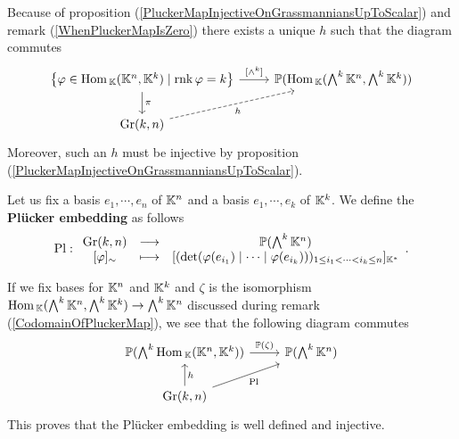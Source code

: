 \begin{remark}
Because of proposition (\ref{PluckerMapInjectiveOnGrassmanniansUpToScalar}) and remark (\ref{WhenPluckerMapIsZero}) there exists a unique $h$ such that the diagram commutes
\[\begin{tikzcd}
	{\cpa{\vp\in \Hom_\K(\K^n,\K^k)\mid \rnk \vp=k}} & {\Pj(\Hom_\K(\bigwedge^k\K^n,\bigwedge^k\K^k))} \\
	{\Gr(k,n)}
	\arrow["\pi", from=1-1, to=2-1]
	\arrow["{[\wedge^k]}", from=1-1, to=1-2]
	\arrow["h"', dashed, from=2-1, to=1-2]
\end{tikzcd}\]
Moreover, such an $h$ must be injective by proposition (\ref{PluckerMapInjectiveOnGrassmanniansUpToScalar}).
\end{remark}


\begin{definition}
Let us fix a basis $e_1,\cdots, e_n$ of $\mathbb{K}^n$ and a basis $e_1,\cdots, e_k$ of $\mathbb{K}^k$. We define the \textbf{Pl\"ucker embedding} as follows
\[\mathrm{Pl}:\begin{array}{ccc} {\mathrm{Gr}(k,n)} & \longrightarrow & {\mathbb{P}(\bigwedge^k\mathbb{K}^n)}\\ {[\varphi]_\sim} & \longmapsto & {[(\det(\varphi(e_{i_1})\mid\cdots\mid\varphi(e_{i_k})))_{1\leq i_1<\cdots<i_k\leq n}]_{\mathbb{K}^\ast}} \end{array}.\]
\end{definition}

\begin{remark}
If we fix bases for $\mathbb{K}^n$ and $\mathbb{K}^k$ and $\zeta$ is the isomorphism $\mathrm{Hom}\,_{\mathbb{K}}(\bigwedge^k\mathbb{K}^n,\bigwedge^k\mathbb{K}^k)\to \bigwedge^k\mathbb{K}^n$ discussed during remark (\ref{CodomainOfPluckerMap}), we see that the following diagram commutes
\[\begin{tikzcd}
	{\Pj(\bigwedge^k\Hom_\K(\K^n,\K^k))} & {\Pj(\bigwedge^k\K^n)} \\
	{\Gr(k,n)}
	\arrow["h"', from=2-1, to=1-1]
	\arrow["{\Pj(\zeta)}", from=1-1, to=1-2]
	\arrow["{\Pl}"', from=2-1, to=1-2]
\end{tikzcd}\]
This proves that the Pl\"ucker embedding is well defined and injective.
\end{remark}

